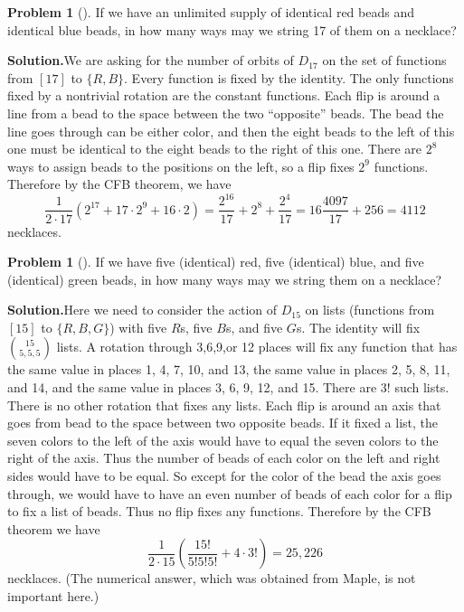 \documentclass[10pt,]{book}
\theoremstyle{plain}
\theoremstyle{definition}
\newtheorem{activity}[project]{Problem}
\theoremstyle{definition}
\numberwithin{equation}{chapter}
\begin{document}
\begin{activity}[]\label{activity-302}
If we have an unlimited supply of identical red beads and identical blue beads, in how many ways may we string 17 of them on a necklace?%
\par\medskip\noindent%
\textbf{Solution.}\quad We are asking for the number of orbits of \(D_{17}\) on the set of functions from \([17]\) to \(\{R,B\}\). Every function is fixed by the identity. The only functions fixed by a nontrivial rotation are the constant functions. Each flip is around a line from a bead to the space between the two ``opposite'' beads. The bead the line goes through can be either color, and then the eight beads to the left of this one must be identical to the eight beads to the right of this one. There are \(2^8\) ways to assign beads to the positions on the left, so a flip fixes \(2^9\) functions. Therefore by the CFB theorem, we have%
\begin{equation*}
\frac{1}{2\cdot 17}\left(2^{17}+ 17\cdot2^9+16\cdot 2\right)=\frac{2^{16}}{17}+2^8 +\frac{2^4}{17}=16\frac{4097}{17}+256=4112
\end{equation*}
necklaces.%
\end{activity}
\begin{activity}[]\label{activity-303}
If we have five (identical) red, five (identical) blue, and five (identical) green beads, in how many ways may we string them on a necklace?%
\par\medskip\noindent%
\textbf{Solution.}\quad Here we need to consider the action of \(D_{15}\) on lists (functions from \([15]\) to \(\{R,B,G\}\)) with five \(R\)s, five \(B\)s, and five \(G\)s. The identity will fix \(\binom{15}{5,5,5}\) lists. A rotation through 3,6,9,or 12 places will fix any function that has the same value in places 1, 4, 7, 10, and 13, the same value in places 2, 5, 8, 11, and 14, and the same value in places 3, 6, 9, 12, and 15. There are \(3!\) such lists. There is no other rotation that fixes any lists. Each flip is around an axis that goes from bead to the space between two opposite beads. If it fixed a list, the seven colors to the left of the axis would have to equal the seven colors to the right of the axis. Thus the number of beads of each color on the left and right sides would have to be equal. So except for the color of the bead the axis goes through, we would have to have an even number of beads of each color for a flip to fix a list of beads. Thus no flip fixes any functions. Therefore by the CFB theorem we have%
\begin{equation*}
\frac{1}{2\cdot15}\left(\frac{15!}{5!5!5!} +4\cdot 3!\right)=25,226
\end{equation*}
necklaces. (The numerical answer, which was obtained from Maple, is not important here.)%
\end{activity}
\end{document}
